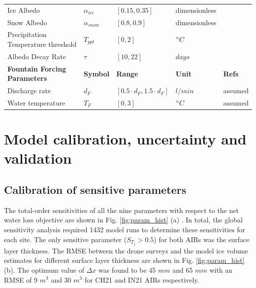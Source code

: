 \begin{table}
\begin{tabular}{lllll}
    Ice Albedo                          & $\alpha_{ice}$        & $[0.15,0.35]$         & dimensionless  &
    \cite{steinerModellingIcecliffBackwasting2015, zollesRobustUncertaintyAssessment2019}           \\
    Snow Albedo                         & $\alpha_{snow}$       & $[0.8,0.9]$        & dimensionless  & \cite{zollesRobustUncertaintyAssessment2019}              \\
    Precipitation Temperature threshold & $T_{ppt}$             & $[0,2]$            & $^{\circ} C$& \cite{shichangResponseZhadangGlacier2010}  \\
    Albedo Decay Rate                   & $\tau$                & $[10,22]$           & $days$ &
    \cite{schmidtImportanceAccurateGlacier2017, oerlemansYearRecordGlobal1998}   \\\midrule
		\textbf{Fountain Forcing Parameters} & \textbf{Symbol} & \textbf{Range} & \textbf{Unit} & \textbf{Refs} \\
    Discharge rate & $d_{F}$             & $[0.5 \cdot d_{F},1.5 \cdot d_{F}]$            & $l/min$& assumed  \\
    Water temperature & $T_{F}$             & $[0,3]$            & $^{\circ} C$  & assumed  \\\bottomrule
	\end{tabular}
\end{table}

\section{Model calibration, uncertainty and validation}

\subsection{Calibration of sensitive parameters}

The total-order sensitivities of all the nine parameters with respect to the net water loss objective are shown
in Fig. \ref{fig:param_hist} (a) . In total, the global sensitivity analysis required 1432 model runs to determine
these sensitivities for each site. The only sensitive parameter ($S_{T_{j}} > 0.5$) for both \ac{AIRs} was the
surface layer thickness. The RMSE between the drone surveys and the model ice volume estimates for different
surface layer thickness are shown in Fig. \ref{fig:param_hist} (b). The optimum value of $\Delta x$ was found to
be 45 $mm$ and 65 $mm$ with an RMSE of 9 $m^3$ and 30 $m^3$ for CH21 and IN21 \ac{AIRs} respectively.

